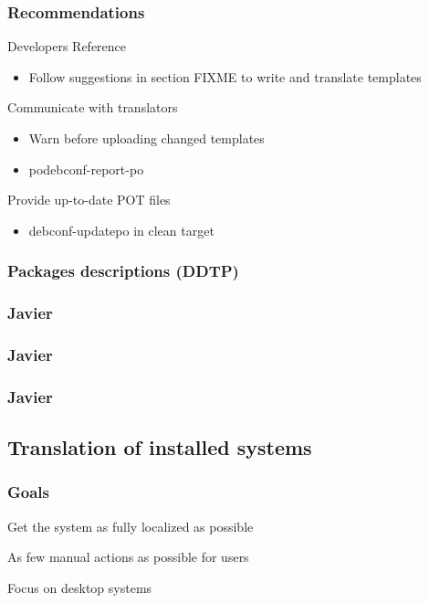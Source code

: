 \documentclass{beamer}
\begin{document}
\begin{frame}
  \frametitle{Recommendations}
	\begin{block}
		{Developers Reference}
		\begin{itemize}
		\item
			Follow suggestions in section FIXME to write and translate templates
		\end{itemize}
	\end{block}
	\begin{block}
		{Communicate with translators}
		\begin{itemize}
		\item
			Warn before uploading changed templates
		\item
			podebconf-report-po
		\end{itemize}
	\end{block}
	\begin{block}
		{Provide up-to-date POT files}
		\begin{itemize}
		\item
			debconf-updatepo in clean target
		\end{itemize}
	\end{block}
\end{frame}

\subsubsection{Packages descriptions (DDTP)}

\begin{frame}
  \frametitle{Javier}
\end{frame}

\begin{frame}
  \frametitle{Javier}
\end{frame}

\begin{frame}
  \frametitle{Javier}
\end{frame}

\subsection{Translation of installed systems}

\begin{frame}
  \frametitle{Goals}
	\begin{block}
		{Get the system as fully localized as possible}
	\end{block}
	\begin{block}
		{As few manual actions as possible for users}
	\end{block}
	\begin{block}
		{Focus on desktop systems}
	\end{block}
\end{frame}
\end{document}
